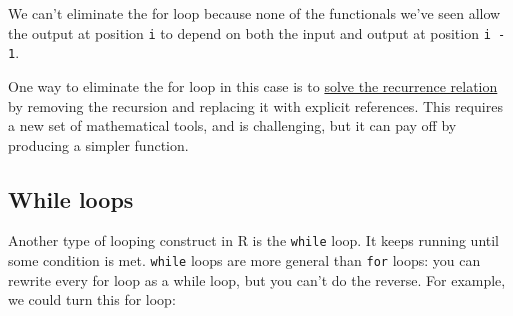 \begin{Shaded}
\begin{Highlighting}[]
\StringTok{ }
  \StringTok{ }\NormalTok{(}\StringTok{ }\NormalTok{)}
    \StringTok{ }\NormalTok{) \{}
      \StringTok{ }
      \StringTok{ }\StringTok{ }\NormalTok{x[i -}\StringTok{ }\NormalTok{] +}\StringTok{ }\NormalTok{(} \NormalTok{-}\StringTok{ }\StringTok{ }\NormalTok{s[i -}\StringTok{ }\NormalTok{]}
    \NormalTok{\}}
  \NormalTok{\}}
\NormalTok{\}}
\StringTok{ }\NormalTok{(}\NormalTok{)}
\NormalTok{)}
\end{Highlighting}
\end{Shaded}

We can't eliminate the for loop because none of the functionals we've
seen allow the output at position \texttt{i} to depend on both the input
and output at position \texttt{i - 1}.

One way to eliminate the for loop in this case is to
\href{http://en.wikipedia.org/wiki/Recurrence_relation\#Solving}{solve
the recurrence relation} by removing the recursion and replacing it with
explicit references. This requires a new set of mathematical tools, and
is challenging, but it can pay off by producing a simpler function.

\subsection{While loops}

Another type of looping construct in R is the \texttt{while} loop. It
keeps running until some condition is met. \texttt{while} loops are more
general than \texttt{for} loops: you can rewrite every for loop as a
while loop, but you can't do the reverse. For example, we could turn
this for loop:  

\begin{Shaded}
\begin{Highlighting}[]
\NormalTok{:}\NormalTok{) }
\end{Highlighting}
\end{Shaded}

